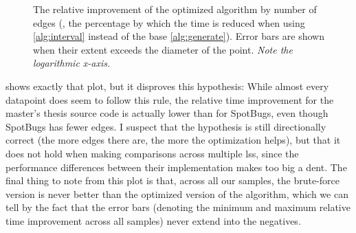 \documentclass[../thesis]{subfiles}
\begin{document}
\begin{figure}
	\begin{center}
		\tikzexternaldisable
		\tikzexternalenable
	\end{center}
	\caption{The relative improvement of the optimized algorithm by number of edges (\ie, the percentage by which the time is reduced when using \cref{alg:interval} instead of the base \cref{alg:generate}).
		Error bars are shown when their extent exceeds the diameter of the point.
		\emph{Note the logarithmic x-axis.}
	}\label{fig:relimprov}
\end{figure}

 shows exactly that plot, but it disproves this hypothesis:
While almost every datapoint does seem to follow this rule, the relative time improvement for the master's thesis source code is actually lower than for SpotBugs, even though SpotBugs has fewer edges.
I suspect that the hypothesis is still directionally correct (the more edges there are, the more the optimization helps), but that it does not hold when making comparisons across multiple \glspl{ls}, since the performance differences between their implementation makes too big a dent.
The final thing to note from this plot is that, across all our samples, the brute-force version is never better than the optimized version of the algorithm, which we can tell by the fact that the error bars (denoting the minimum and maximum relative time improvement across all samples) never extend into the negatives.
\end{document}
